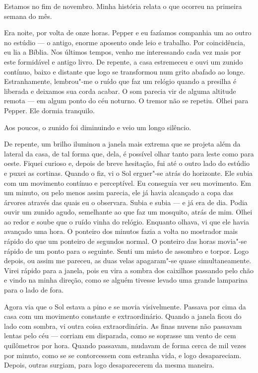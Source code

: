 Estamos no fim de novembro. Minha história relata o que ocorreu na primeira semana do mês.

Era noite, por volta de onze horas. Pepper e eu fazíamos companhia um ao outro no estúdio --- o antigo, enorme aposento
onde leio e trabalho. Por coincidência, eu lia a Bíblia. Nos últimos tempos, venho me interessando cada vez mais por este
formidável e antigo livro. De repente, a casa estremeceu e ouvi um zunido contínuo, baixo e distante que logo se
transformou num grito abafado ao longe. Estranhamente, lembrou"-me o ruído que faz um relógio quando a presilha é
liberada e deixamos sua corda acabar. O som parecia vir de alguma altitude remota --- em algum ponto do céu noturno. O
tremor não se repetiu. Olhei para Pepper. Ele dormia tranquilo.

Aos poucos, o zunido foi diminuindo e veio um longo silêncio.

De repente, um brilho iluminou a janela mais extrema que se projeta além da lateral da casa, de tal forma que,
dela, é possível olhar tanto para leste como para oeste. Fiquei curioso e, depois de breve hesitação, fui até
o outro lado do estúdio e puxei as cortinas. Quando o fiz, vi o Sol erguer"-se atrás do horizonte. Ele subia com um
movimento contínuo e perceptível. Eu conseguia ver seu movimento. Em um minuto, ou pelo menos assim parecia, ele já
havia alcançado a copa das árvores através das quais eu o observara. Subia e subia --- e já era de dia. Podia ouvir um
zunido agudo, semelhante ao que faz um mosquito, atrás de mim. Olhei ao redor e soube que o ruído vinha do relógio.
Enquanto olhava, vi que ele havia avançado uma hora. O ponteiro dos minutos fazia a volta no mostrador mais rápido do
que um ponteiro de segundos normal. O ponteiro das horas movia"-se rápido de um ponto para o seguinte. Senti um
misto de assombro e torpor. Logo depois, ou assim me pareceu, as duas velas apagaram"-se quase simultaneamente. Virei
rápido para a janela, pois eu vira a sombra dos caixilhos passando pelo chão e vindo na minha direção, como se alguém
tivesse levado uma grande lamparina para o lado de fora.

Agora via que o Sol estava a pino e se movia visivelmente. Passava por cima da casa com um movimento constante e
extraordinário. Quando a janela ficou do lado com sombra, vi outra coisa extraordinária. As finas nuvens não passavam
lentas pelo céu --- corriam em disparada, como se soprasse um vento de cem quilômetros por hora. Quando passavam,
mudavam de forma cerca de mil vezes por minuto, como se se contorcessem com estranha vida, e logo desapareciam. Depois,
outras surgiam, para logo desaparecerem da mesma maneira.


